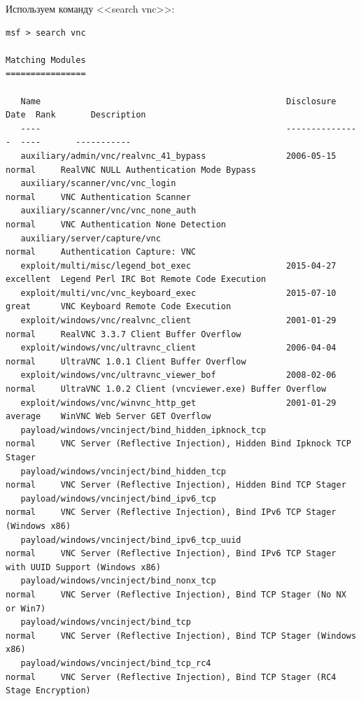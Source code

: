 \documentclass[10pt,a4paper]{report}
\begin{document}
		Используем команду 
		<<search vnc>>:
		\begin{lstlisting}
msf > search vnc

Matching Modules
================

   Name                                                 Disclosure Date  Rank       Description
   ----                                                 ---------------  ----       -----------
   auxiliary/admin/vnc/realvnc_41_bypass                2006-05-15       normal     RealVNC NULL Authentication Mode Bypass
   auxiliary/scanner/vnc/vnc_login                                       normal     VNC Authentication Scanner
   auxiliary/scanner/vnc/vnc_none_auth                                   normal     VNC Authentication None Detection
   auxiliary/server/capture/vnc                                          normal     Authentication Capture: VNC
   exploit/multi/misc/legend_bot_exec                   2015-04-27       excellent  Legend Perl IRC Bot Remote Code Execution
   exploit/multi/vnc/vnc_keyboard_exec                  2015-07-10       great      VNC Keyboard Remote Code Execution
   exploit/windows/vnc/realvnc_client                   2001-01-29       normal     RealVNC 3.3.7 Client Buffer Overflow
   exploit/windows/vnc/ultravnc_client                  2006-04-04       normal     UltraVNC 1.0.1 Client Buffer Overflow
   exploit/windows/vnc/ultravnc_viewer_bof              2008-02-06       normal     UltraVNC 1.0.2 Client (vncviewer.exe) Buffer Overflow
   exploit/windows/vnc/winvnc_http_get                  2001-01-29       average    WinVNC Web Server GET Overflow
   payload/windows/vncinject/bind_hidden_ipknock_tcp                     normal     VNC Server (Reflective Injection), Hidden Bind Ipknock TCP Stager
   payload/windows/vncinject/bind_hidden_tcp                             normal     VNC Server (Reflective Injection), Hidden Bind TCP Stager
   payload/windows/vncinject/bind_ipv6_tcp                               normal     VNC Server (Reflective Injection), Bind IPv6 TCP Stager (Windows x86)
   payload/windows/vncinject/bind_ipv6_tcp_uuid                          normal     VNC Server (Reflective Injection), Bind IPv6 TCP Stager with UUID Support (Windows x86)
   payload/windows/vncinject/bind_nonx_tcp                               normal     VNC Server (Reflective Injection), Bind TCP Stager (No NX or Win7)
   payload/windows/vncinject/bind_tcp                                    normal     VNC Server (Reflective Injection), Bind TCP Stager (Windows x86)
   payload/windows/vncinject/bind_tcp_rc4                                normal     VNC Server (Reflective Injection), Bind TCP Stager (RC4 Stage Encryption)

\end{lstlisting}
\end{document}
